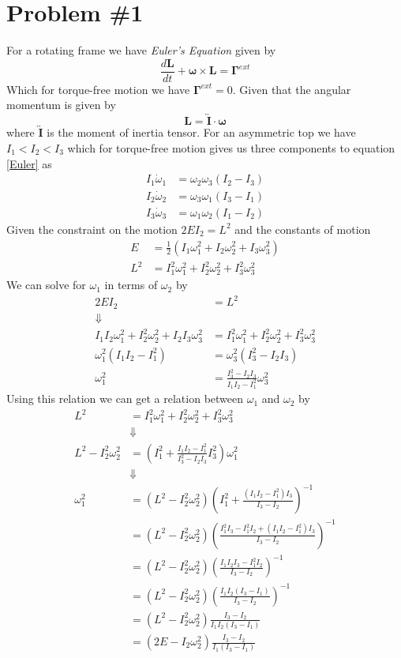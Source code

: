 \documentclass[11pt]{article}
\numberwithin{equation}{section}
\begin{document}


\section{Problem \#1}
For a rotating frame we have \emph{Euler's Equation} given by
\begin{equation}
\frac{d\mathbf{L}}{dt} + \pmb{\omega}\times\mathbf{L} = \pmb{\Gamma}^{ext}
\label{Euler}
\end{equation}
Which for torque-free motion we have $\pmb{\Gamma}^{ext} = 0$. Given that the angular
momentum is given by
$$\mathbf{L} = \overleftrightarrow{\mathbf{I}}\cdot\pmb{\omega}$$
where $\overleftrightarrow{\mathbf{I}}$ is the moment of inertia tensor. For an asymmetric 
top we have $I_1<I_2<I_3$ which for torque-free motion gives us three components to equation
\ref{Euler} as
\begin{align*}
I_1\dot{\omega}_1 &= \omega_{2}\omega_{3}(I_2-I_3)\\
I_2\dot{\omega}_2 &= \omega_{3}\omega_{1}(I_3-I_1)\\
I_3\dot{\omega}_3 &= \omega_{1}\omega_{2}(I_1-I_2)
\end{align*}
Given the constraint on the motion $2EI_2 = L^2$ and the constants of motion
\begin{align*}
E &= \frac{1}{2}\left(I_1\omega_1^2+I_2\omega_2^2+I_3\omega_3^2\right)\\
L^2 &= I_1^2\omega_1^2+I_2^2\omega_2^2+I_3^2\omega_3^2
\end{align*}
We can solve for $\omega_1$ in terms of $\omega_2$ by
\begin{align*}
2EI_2 &= L^2\\
\Downarrow\\
I_1I_2\omega_1^2+I_2^2\omega_2^2+I_2I_3\omega_3^2 &= I_1^2\omega_1^2+I_2^2\omega_2^2+I_3^2\omega_3^2\\
\omega_1^2(I_1I_2-I_1^2) &= \omega_3^2(I_3^2-I_2I_3)\\
\omega_1^2 &= \frac{I_3^2-I_2I_3}{I_1I_2-I_1^2}\omega_3^2
\end{align*}
Using this relation we can get a relation between $\omega_1$ and $\omega_2$ by
\begin{align*}
L^2 &= I_1^2\omega_1^2+I_2^2\omega_2^2+I_3^2\omega_3^2\\
&\Downarrow\\
L^2-I_2^2\omega_2^2 &= \left(I_1^2+\frac{I_1I_2-I_1^2}{I_3^2-I_2I_3}I_3^2\right)\omega_1^2\\
&\Downarrow\\
\omega_1^{2} &= \left(L^2-I_2^2\omega_2^2\right)\left(I_1^2+\frac{(I_1I_2-I_1^2)I_3}{I_3-I_2}\right)^{-1}\\
&= \left(L^2-I_2^2\omega_2^2\right)\left(\frac{I_1^2I_3-I_1^2I_2+(I_1I_2-I_1^2)I_3}{I_3-I_2}\right)^{-1}\\
&= \left(L^2-I_2^2\omega_2^2\right)\left(\frac{I_1I_2I_3-I_1^2I_2}{I_3-I_2}\right)^{-1}\\
&= \left(L^2-I_2^2\omega_2^2\right)\left(\frac{I_1I_2(I_3-I_1)}{I_3-I_2}\right)^{-1}\\
&= \left(L^2-I_2^2\omega_2^2\right)\frac{I_3-I_2}{I_1I_2(I_3-I_1)}\\
&= \left(2E-I_2\omega_2^2\right)\frac{I_3-I_2}{I_1(I_3-I_1)}
\end{align*}
\end{document}
